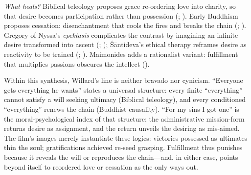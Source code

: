 \emph{What heals?} Biblical teleology proposes grace re-ordering love into charity, so that desire becomes participation rather than possession (\parencite{AugustineCity2003}; \parencite{AquinasST1947}). Early Buddhism proposes cessation: disenchantment that cools the fires and breaks the chain (\parencite{BodhiSN2000}; \parencite{Rahula1959}). Gregory of Nyssa’s \emph{epektasis} complicates the contrast by imagining an infinite desire transformed into ascent (\parencite{GregoryMoses1978}; \parencite{GregoryBeatitudes1954}); Śāntideva’s ethical therapy reframes desire as reactivity to be trained (\parencite{SantidevaBCA1995}; \parencite{Gethin1998}). Maimonides adds a rationalist variant: fulfillment that multiplies passions obscures the intellect (\parencite{MaimonidesGuide1963}).

Within this synthesis, Willard’s line is neither bravado nor cynicism. ``Everyone gets everything he wants'' states a universal structure: every finite ``everything'' cannot satisfy a will seeking ultimacy (Biblical teleology), and every conditioned ``everything'' renews the chain (Buddhist causality). ``For my sins I got one'' is the moral-psychological index of that structure: the administrative mission-form returns desire as assignment, and the return unveils the desiring as mis-aimed. The film’s images merely instantiate these logics: victories possessed as ultimates thin the soul; gratifications achieved re-seed grasping. Fulfillment thus punishes because it reveals the will or reproduces the chain---and, in either case, points beyond itself to reordered love or cessation as the only ways out.
